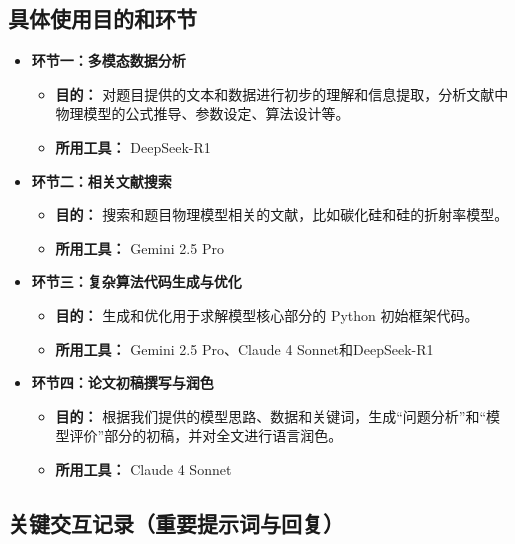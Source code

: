 \documentclass[a4paper]{ctexart}
\begin{document}
\subsection{具体使用目的和环节}
\begin{itemize}
    \item \textbf{环节一：多模态数据分析}
        \begin{itemize}[label={}, leftmargin=*]
            \item \textbf{目的：} 对题目提供的文本和数据进行初步的理解和信息提取，分析文献中物理模型的公式推导、参数设定、算法设计等。
            \item \textbf{所用工具：} DeepSeek-R1
        \end{itemize}
        
    \item \textbf{环节二：相关文献搜索}
        \begin{itemize}[label={}, leftmargin=*]
            \item \textbf{目的：} 搜索和题目物理模型相关的文献，比如碳化硅和硅的折射率模型。
            \item \textbf{所用工具：} Gemini 2.5 Pro
        \end{itemize}
        
    \item \textbf{环节三：复杂算法代码生成与优化}
        \begin{itemize}[label={}, leftmargin=*]
            \item \textbf{目的：} 生成和优化用于求解模型核心部分的 Python 初始框架代码。
            \item \textbf{所用工具：} Gemini 2.5 Pro、Claude 4 Sonnet和DeepSeek-R1
        \end{itemize}
        
    \item \textbf{环节四：论文初稿撰写与润色}
        \begin{itemize}[label={}, leftmargin=*]
            \item \textbf{目的：} 根据我们提供的模型思路、数据和关键词，生成“问题分析”和“模型评价”部分的初稿，并对全文进行语言润色。
            \item \textbf{所用工具：} Claude 4 Sonnet
        \end{itemize}
\end{itemize}

\subsection{关键交互记录（重要提示词与回复）}
\end{document}
